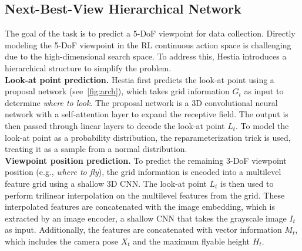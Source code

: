 \subsection{Next-Best-View Hierarchical Network}
\label{sec:nbv_net}

The goal of the task is to predict a 5-DoF viewpoint for data collection.  
Directly modeling the 5-DoF viewpoint in the RL continuous action space is challenging due to the high-dimensional search space.  
To address this, Hestia introduces a hierarchical structure to simplify the problem. %
\\
\textbf{Look-at point prediction.} Hestia first predicts the look-at point using a proposal network (see~\cref{fig:arch}), which takes grid information $G_t$ as input to determine \textit{where to look}.  
The proposal network is a 3D convolutional neural network with a self-attention layer to expand the receptive field.
The output is then passed through linear layers to decode the look-at point $L_t$.  
To model the look-at point as a probability distribution, the reparameterization trick is used, treating it as a sample from a normal distribution.  %
\\
\textbf{Viewpoint position prediction. } To predict the remaining 3-DoF viewpoint position (e.g., \textit{where to fly}), the grid information is encoded into a multilevel feature grid using a shallow 3D CNN.  
The look-at point $L_t$ is then used to perform trilinear interpolation on the multilevel features from the grid.  
These interpolated features are concatenated with the image embedding, which is extracted by an image encoder, a shallow CNN that takes the grayscale image $I_t$ as input.  
Additionally, the features are concatenated with vector information $M_t$, which includes the camera pose $X_t$ and the maximum flyable height $H_t$.

